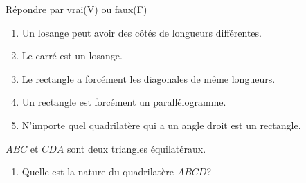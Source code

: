 \documentclass[a4paper,12pt]{article}
\begin{document}
\devoir[sem=2,prv=true,ds=true,num=5 ,niv=1 ,date=08/05/2023]
\begin{exo}[10]
Répondre par vrai(V) ou faux(F)
\begin{enumerate}
\item Un losange peut avoir des côtés de longueurs différentes.
\item Le carré est un losange.
\item Le rectangle a forcément les diagonales de même longueurs.
\item Un rectangle est forcément un parallélogramme.
\item N'importe quel quadrilatère qui a un angle droit est un rectangle.
\end{enumerate}
\end{exo}

\begin{exo}[4]
\begin{minipage}{.68\linewidth}
$ABC$ et $CDA$ sont deux triangles équilatéraux.
\begin{enumerate}
\item Quelle est la nature du quadrilatère $ABCD$?
\end{enumerate}
\anserline[5]
\end{minipage}
\begin{minipage}{.32\linewidth}
\end{minipage}

\end{exo}
\end{document}
